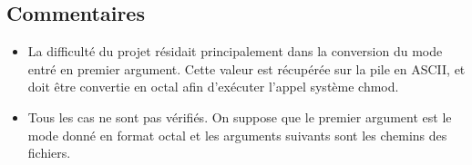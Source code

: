 \documentclass[french,10pt,A4]{report}
\begin{document}


\subsection{Commentaires}

\begin{itemize}
\item La difficulté du projet résidait principalement dans la conversion du mode
    entré en premier argument. Cette valeur est récupérée sur la pile en ASCII,
    et doit être convertie en octal afin d'exécuter l'appel système chmod.
\item Tous les cas ne sont pas vérifiés. On suppose que le premier argument est
    le mode donné en format octal et les arguments suivants sont les chemins des
    fichiers.
\end{itemize}
\end{document}
